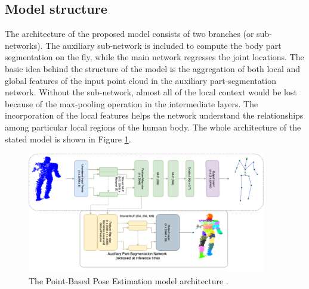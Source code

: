 \subsection{Model structure}
The architecture of the proposed model consists of two branches (or sub-networks). The auxiliary sub-network is included to compute the body part segmentation on the fly, while the main network regresses the joint locations. The basic idea behind the structure of the model is the aggregation of both local and global features of the input point cloud in the auxiliary part-segmentation network. Without the sub-network, almost all of the local context would be lost because of the max-pooling operation in the intermediate layers. The incorporation of the local features helps the network understand the relationships among particular local regions of the human body. The whole architecture of the stated model is shown in Figure \ref{fig:PBPE}.\par
\vspace{5mm}

\begin{figure}[H]
\begin{center}
  \includegraphics[height=200px]{images/implementation/pbpe2.PNG}
  \caption{The Point-Based Pose Estimation model architecture \cite{Ali19}.}
  \label{fig:PBPE}
\end{center}
\end{figure}

